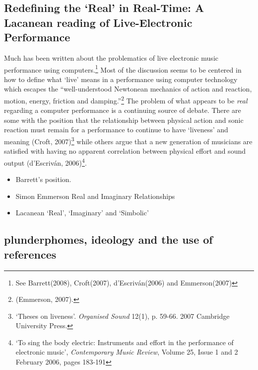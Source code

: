\subsection{Redefining the `Real' in Real-Time: A Lacanean reading of Live-Electronic Performance}
Much has been written about the problematics of live electronic music performance using computers.\footnote{ See Barrett(2008), Croft(2007), d'Escriv\'{a}n(2006) and Emmerson(2007)} Most of the discussion seems to be centered in how to define what `live' means in a performance using computer technology which escapes the ``well-understood Newtonean mechanics of action and reaction, motion, energy, friction and damping.''\footnote{ (Emmerson, 2007).} The problem of what appears to be \emph{real} regarding a computer performance is a continuing source of debate. There are some with the position that the relationship between physical action and sonic reaction must remain for a performance to continue to have `liveness' and meaning (Croft, 2007)\footnote{`Theses on liveness'. \emph{Organised Sound} 12(1), p. 59-66. 2007 Cambridge University Press.} while others argue that a new generation of musicians are satisfied with having no apparent correlation between physical effort and sound output (d'Escriv\'{a}n, 2006)\footnote{`To sing the body electric: Instruments and effort in the performance of electronic music', \emph{Contemporary Music Review}, Volume 25, Issue 1 and 2 February 2006, pages 183-191}. 
\begin{itemize}
\item
Barrett's position. 
\item
Simon Emmerson Real and Imaginary Relationships
\item
Lacanean `Real', `Imaginary' and `Simbolic'
\end{itemize}


\subsection{plunderphomes, ideology and the use of references}


